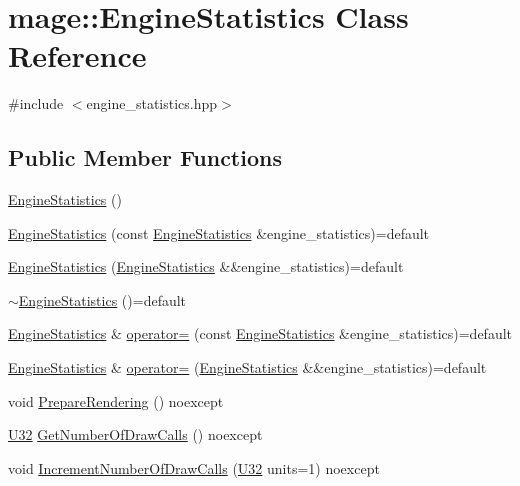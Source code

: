 \hypertarget{classmage_1_1_engine_statistics}{}\section{mage\+:\+:Engine\+Statistics Class Reference}
\label{classmage_1_1_engine_statistics}


{\ttfamily \#include $<$engine\+\_\+statistics.\+hpp$>$}

\subsection*{Public Member Functions}
\begin{DoxyCompactItemize}
\item 
\hyperlink{classmage_1_1_engine_statistics_acbaa39e0e0ee0d6cb5c8d174bb80a3fd}{Engine\+Statistics} ()
\item 
\hyperlink{classmage_1_1_engine_statistics_a8361fa991298c7669b4e3c8262acff60}{Engine\+Statistics} (const \hyperlink{classmage_1_1_engine_statistics}{Engine\+Statistics} \&engine\+\_\+statistics)=default
\item 
\hyperlink{classmage_1_1_engine_statistics_acb3eb7a8f16733d29b4a0e4490723cd5}{Engine\+Statistics} (\hyperlink{classmage_1_1_engine_statistics}{Engine\+Statistics} \&\&engine\+\_\+statistics)=default
\item 
\hyperlink{classmage_1_1_engine_statistics_a471f643061b881ae69cc807b34c48127}{$\sim$\+Engine\+Statistics} ()=default
\item 
\hyperlink{classmage_1_1_engine_statistics}{Engine\+Statistics} \& \hyperlink{classmage_1_1_engine_statistics_a6c5e8b9a5806e67f6f93a3c558293249}{operator=} (const \hyperlink{classmage_1_1_engine_statistics}{Engine\+Statistics} \&engine\+\_\+statistics)=default
\item 
\hyperlink{classmage_1_1_engine_statistics}{Engine\+Statistics} \& \hyperlink{classmage_1_1_engine_statistics_a4674d3856fee372e05f1bed017e46d5b}{operator=} (\hyperlink{classmage_1_1_engine_statistics}{Engine\+Statistics} \&\&engine\+\_\+statistics)=default
\item 
void \hyperlink{classmage_1_1_engine_statistics_a722912aa5e93caff589a52bb10be930d}{Prepare\+Rendering} () noexcept
\item 
\hyperlink{namespacemage_a41c104c036fba3756a74e19f793eeaa1}{U32} \hyperlink{classmage_1_1_engine_statistics_a2bfcab5d823c018174e205741cbed4d4}{Get\+Number\+Of\+Draw\+Calls} () noexcept
\item 
void \hyperlink{classmage_1_1_engine_statistics_af26859407a4780e9471131fcfbe3a125}{Increment\+Number\+Of\+Draw\+Calls} (\hyperlink{namespacemage_a41c104c036fba3756a74e19f793eeaa1}{U32} units=1) noexcept
\end{DoxyCompactItemize}
